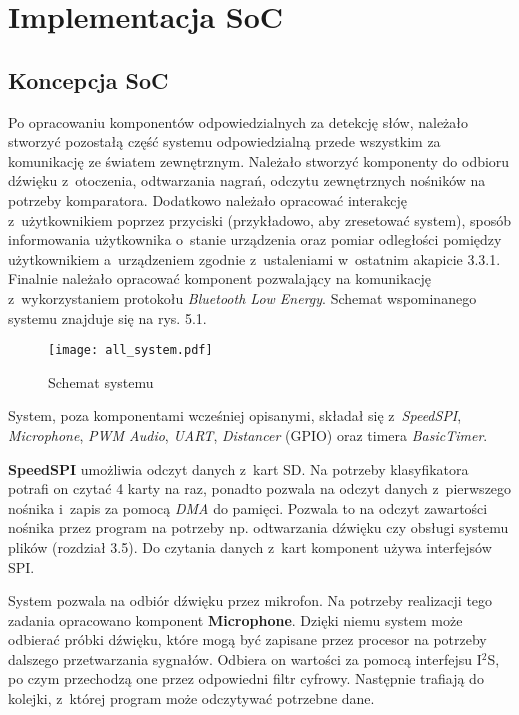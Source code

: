 \section{Implementacja SoC}
\subsection{Koncepcja SoC}
Po opracowaniu komponentów odpowiedzialnych za detekcję słów, należało stworzyć pozostałą część systemu odpowiedzialną przede wszystkim za komunikację ze światem zewnętrznym. Należało stworzyć komponenty do odbioru dźwięku z~otoczenia, odtwarzania nagrań, odczytu zewnętrznych nośników na potrzeby komparatora. Dodatkowo należało opracować interakcję z~użytkownikiem poprzez przyciski (przykładowo, aby zresetować system), sposób informowania użytkownika o~stanie urządzenia oraz pomiar odległości pomiędzy użytkownikiem a~urządzeniem zgodnie z~ustaleniami w~ostatnim akapicie 3.3.1. Finalnie należało opracować komponent pozwalający na komunikację z~wykorzystaniem protokołu \textit{Bluetooth Low Energy}. Schemat wspominanego systemu znajduje się na rys. 5.1.

\begin{figure}[h]
	\centering
	\texttt{[image: all\_system.pdf]}
	\caption{Schemat systemu}
\end{figure}
\FloatBarrier

System, poza komponentami wcześniej opisanymi, składał się z~\textit{SpeedSPI}, \textit{Microphone}, \textit{PWM Audio}, \textit{UART}, \textit{Distancer} (GPIO) oraz timera \textit{BasicTimer}.

\textbf{SpeedSPI} umożliwia odczyt danych z~kart SD. Na potrzeby klasyfikatora potrafi on czytać 4 karty na raz, ponadto pozwala na odczyt danych z~pierwszego nośnika i~zapis za pomocą \textit{DMA} do pamięci. Pozwala to na odczyt zawartości nośnika przez program na potrzeby np. odtwarzania dźwięku czy obsługi systemu plików (rozdział 3.5). Do czytania danych z~kart komponent używa interfejsów SPI.

System pozwala na odbiór dźwięku przez mikrofon. Na potrzeby realizacji tego zadania opracowano komponent \textbf{Microphone}. Dzięki niemu system może odbierać próbki dźwięku, które mogą być zapisane przez procesor na potrzeby dalszego przetwarzania sygnałów. Odbiera on wartości za pomocą interfejsu I$^2$S, po czym przechodzą one przez odpowiedni filtr cyfrowy. Następnie trafiają do kolejki, z~której program może odczytywać potrzebne dane.


